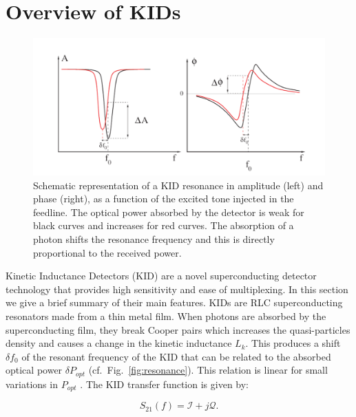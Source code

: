 \section{Overview of KIDs}
\label{sec2}

\begin{figure}
\center
	\includegraphics[scale=0.4]{Figures/resonance.png}
	\caption{Schematic representation of a KID resonance in amplitude (left) and phase (right), as a function of the excited tone injected in the feedline. The optical power absorbed by the detector is weak for black curves and increases for red curves. The absorption of a photon shifts the resonance frequency and this is directly proportional to the received power.}
	\label{resonance}
\end{figure}

Kinetic Inductance Detectors (KID) are a novel superconducting detector technology
that provides high sensitivity and ease of multiplexing. In this section we give
a brief summary of their main features. KIDs are RLC superconducting
resonators made from a thin metal film. When photons are absorbed by
the superconducting film, they break Cooper pairs which increases the
quasi-particles density and causes a change in the kinetic inductance
$L_{k}$. This produces a shift $\delta f_{0}$ of the resonant frequency of the
KID \citep{2013A&A...551L..12C} that can be related to the absorbed optical
power $\delta P_{opt}$ (cf.~Fig.~\ref{fig:resonance}). This relation is linear for small variations in
$P_{opt}$ \citep{2010ApPhL..96z3511S}. The KID transfer function is given by:

\begin{equation}
S_{21}(f) = \mathcal{I} +j\mathcal{Q} .
\end{equation}

